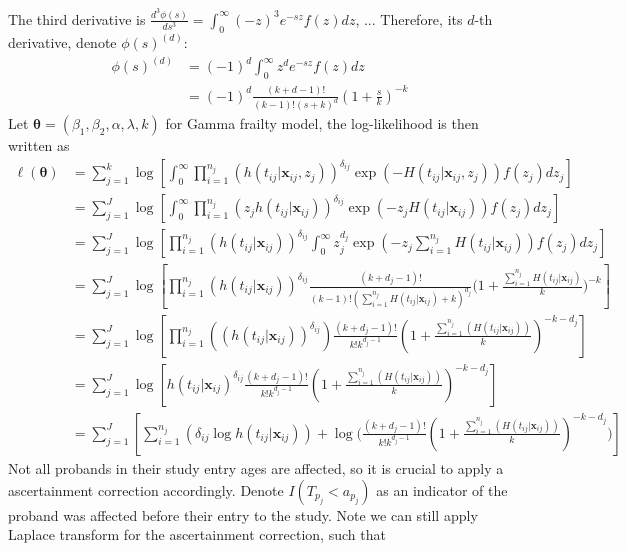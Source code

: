 \documentclass[preprint,12pt]{elsarticle}
\begin{document}
\noindent
The third derivative is $\frac{d^3\phi(s)}{ds^3}=\int_0^{\infty}(-z)^3e^{-sz}f(z)dz$, ...
Therefore, its $d$-th derivative, denote $\phi(s)^{(d)}$:
\begin{align}
    \phi(s)^{(d)}&=(-1)^d\int_0^{\infty}z^de^{-sz}f(z)dz\\
    &=(-1)^d\frac{(k+d-1)!}{(k-1)!(s+k)^d}(1+\frac{s}{k})^{-k}
\end{align}
Let $\boldsymbol{\theta}=(\beta_1, \beta_2, \alpha, \lambda, k)$ for Gamma frailty model, the log-likelihood is then written as
\begin{align}
    \ell(\boldsymbol{\theta})&=\sum_{j=1}^k\log \left [ \int_0^{\infty}\prod_{i=1}^{n_j}(h(t_{ij}|\mathbf{x}_{ij}, z_j))^{\delta_{ij}}\exp (-H(t_{ij}|\mathbf{x}_{ij}, z_j))f(z_j)dz_j\right ]\\
    &=\sum_{j=1}^J\log\left [\int_{0}^{\infty}\prod_{i=1}^{n_j}(z_j h(t_{ij}|\mathbf{x}_{ij}))^{\delta_{ij}}\exp(-z_j H(t_{ij}|\mathbf{x}_{ij}))f(z_j)dz_j\right ]\\
    &=\sum_{j=1}^J\log\left [\prod_{i=1}^{n_j}(h(t_{ij}|\mathbf{x}_{ij}))^{\delta_{ij}}\int_0^{\infty}z_j^{d_j}\exp(-z_j\sum_{i=1}^{n_j}H(t_{ij}|\mathbf{x}_{ij}))f(z_j)dz_j \right ]\\
    &=\sum_{j=1}^J\log\left [\prod_{i=1}^{n_j}(h(t_{ij}|\mathbf{x}_{ij}))^{\delta_{ij}}\frac{(k+d_j-1)!}{(k-1)!(\sum_{i=1}^{n_j}H(t_{ij}|\mathbf{x}_{ij})+k)^{d_j}}\Big(1+\frac{\sum_{i=1}^{n_j}H(t_{ij}|\mathbf{x}_{ij})}{k}\Big)^{-k}\right ]\\
    &=\sum_{j=1}^J\log\left [\prod_{i=1}^{n_j}((h(t_{ij}|\mathbf{x}_{ij}) )^{\delta_{ij}})\frac{(k+d_j-1)!}{k!k^{d_j-1}}(1+\frac{\sum_{i=1}^{n_j}(H(t_{ij}|\mathbf{x}_{ij}))}{k})^{-k-d_j} \right ]\\
    &=\sum_{j=1}^J\log\left [h(t_{ij}|\mathbf{x}_{ij})^{\delta_{ij}} \frac{(k+d_j-1)!}{k!k^{d_j-1}}(1+\frac{\sum_{i=1}^{n_j}(H(t_{ij}|\mathbf{x}_{ij}))}{k})^{-k-d_j} \right ]\\
    &=\sum_{j=1}^J\left [\sum_{i=1}^{n_j}(\delta_{ij}\log h(t_{ij}|\mathbf{x}_{ij})) + \log\Big (\frac{(k+d_j-1)!}{k!k^{d_j-1}}(1+\frac{\sum_{i=1}^{n_j}(H(t_{ij}|\mathbf{x}_{ij}))}{k})^{-k-d_j}\Big )\right ]
\end{align}
 Not all probands in their study entry ages are affected, so it is crucial to apply a ascertainment correction accordingly. 
 Denote $I(T_{p_j}<a_{p_j})$ as an indicator of the proband was affected before their entry to the study.
 Note we can still apply Laplace transform for the ascertainment correction, such that
\end{document}
